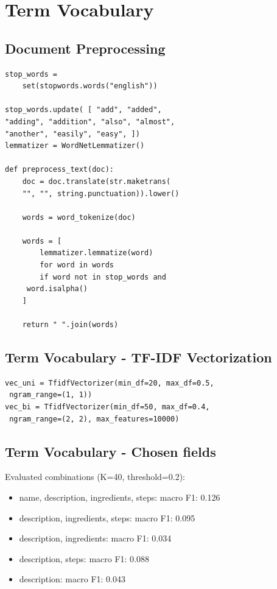 \documentclass[a4paper,11pt]{article}
\begin{document}
\section{Term Vocabulary}
\subsection{Document Preprocessing}
\begin{verbatim}
stop_words = 
    set(stopwords.words("english"))

stop_words.update( [ "add", "added", 
"adding", "addition", "also", "almost",
"another", "easily", "easy", ])
lemmatizer = WordNetLemmatizer()

def preprocess_text(doc):
    doc = doc.translate(str.maketrans(
    "", "", string.punctuation)).lower()

    words = word_tokenize(doc)

    words = [
        lemmatizer.lemmatize(word)
        for word in words
        if word not in stop_words and
     word.isalpha()
    ]

    return " ".join(words)
\end{verbatim}

\subsection{Term Vocabulary - TF-IDF Vectorization}
\begin{verbatim}
vec_uni = TfidfVectorizer(min_df=20, max_df=0.5,
 ngram_range=(1, 1))
vec_bi = TfidfVectorizer(min_df=50, max_df=0.4,
 ngram_range=(2, 2), max_features=10000)
\end{verbatim}

\subsection{Term Vocabulary - Chosen fields}
Evaluated combinations (K=40, threshold=0.2):
\begin{itemize}
    \item name, description, ingredients, steps: macro F1: 0.126
    \item description, ingredients, steps: macro F1: 0.095
    \item description, ingredients: macro F1: 0.034
    \item description, steps: macro F1: 0.088
    \item description: macro F1: 0.043
\end{itemize}
\end{document}
